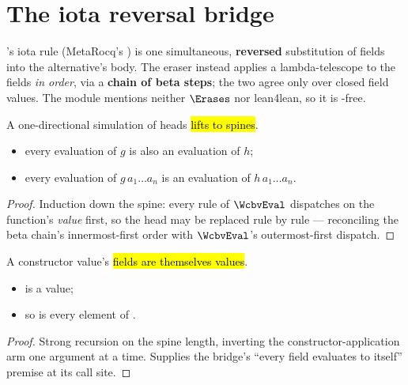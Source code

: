 \section{The iota reversal bridge}
\label{sec:refinement:iota}

\lbox{}'s iota rule (MetaRocq's ) is one simultaneous, \textbf{reversed} substitution of
fields into the alternative's body. The eraser instead applies a lambda-telescope to the fields
\emph{in order}, via a \textbf{chain of beta steps}; the two agree only over closed field values. The
module mentions neither $\Erases$ nor lean4lean, so it is -free.

\begin{lemma}
\label{lem:wcbvEval_mkApps_head_congr}
\leanok
{}
 A one-directional simulation of heads \hl{lifts to spines}.
\begin{itemize}
\item {} every evaluation of $g$ is also an evaluation of $h$;
\item {} every evaluation of $g\,a_1\ldots a_n$ is an evaluation of $h\,a_1\ldots a_n$.
\end{itemize}
\end{lemma}
\begin{proof}
\leanok
{}
 Induction down the spine: every  rule of $\WcbvEval$ dispatches on the function's
\emph{value} first, so the head may be replaced rule by rule --- reconciling the beta chain's
innermost-first order with $\WcbvEval$'s outermost-first dispatch.
\end{proof}

\begin{lemma}
\label{lem:value_mkApps_construct_args}
\leanok
{}
 A constructor value's \hl{fields are themselves values}.
\begin{itemize}
\item {}  is a value;
\item {} so is every element of .
\end{itemize}
\end{lemma}
\begin{proof}
\leanok
{}
 Strong recursion on the spine length, inverting the constructor-application arm one argument
at a time. Supplies the bridge's ``every field evaluates to itself'' premise at its call site.
\end{proof}

